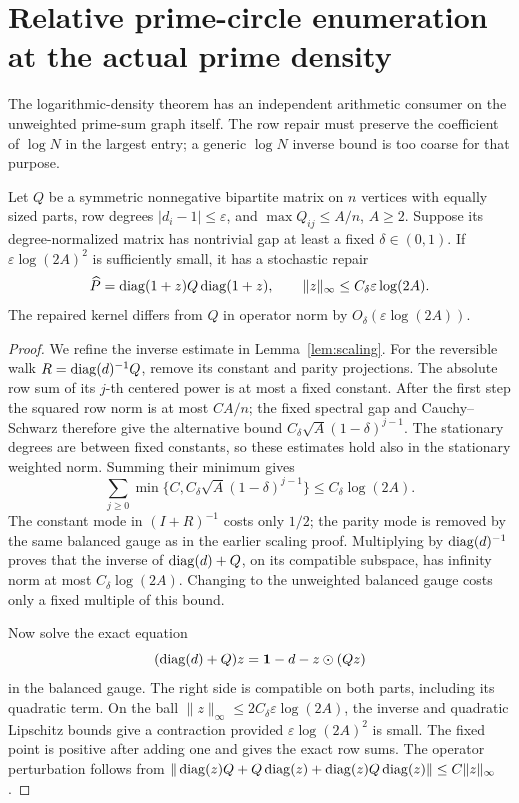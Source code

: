 \section{Relative prime-circle enumeration at the actual prime density}
\label{sec:relativeprimecircles}
The logarithmic-density theorem has an independent arithmetic
consumer on the unweighted prime-sum graph itself.
The row repair must preserve the coefficient of \(\log N\)
in the largest entry; a generic \(\log N\) inverse bound is
too coarse for that purpose.

\begin{lemma}
\label{lem:diffusionscaling}
Let \(Q\) be a symmetric nonnegative bipartite matrix on
\(n\) vertices with equally sized parts, row degrees
\(|d_i-1|\leq\varepsilon\), and \(\max Q_{ij}\leq A/n\),
\(A\geq2\).
Suppose its degree-normalized matrix has nontrivial gap
at least a fixed \(\delta\in(0,1)\).
If \(\varepsilon\log(2A)^2\) is sufficiently small, it has
a stochastic repair
\[
 \widehat P=\operatorname{diag}(1+z)Q\operatorname{diag}(1+z),\qquad
 \|z\|_\infty\leq C_\delta\varepsilon\log(2A).
\]
The repaired kernel differs from \(Q\) in operator norm
by \(O_\delta(\varepsilon\log(2A))\).
\end{lemma}
\begin{proof}
We refine the inverse estimate in Lemma~\ref{lem:scaling}.
For the reversible walk \(R=\operatorname{diag}(d)^{-1}Q\), remove its
constant and parity projections.
The absolute row sum of its \(j\)-th centered power is at
most a fixed constant.
After the first step the squared row norm is at most
\(C A/n\); the fixed spectral gap and Cauchy--Schwarz
therefore give the alternative bound
\(C_\delta\sqrt A(1-\delta)^{j-1}\).
The stationary degrees are between fixed constants, so
these estimates hold also in the stationary weighted norm.
Summing their minimum gives
\[
 \sum_{j\geq0}\min\{C,C_\delta\sqrt A
                                      (1-\delta)^{j-1}\}
                         \leq C_\delta\log(2A).
\]
The constant mode in \((I+R)^{-1}\) costs only \(1/2\);
the parity mode is removed by the same balanced gauge
as in the earlier scaling proof.
Multiplying by \(\operatorname{diag}(d)^{-1}\) proves that the inverse
of \(\operatorname{diag}(d)+Q\), on its compatible subspace, has
infinity norm at most \(C_\delta\log(2A)\).
Changing to the unweighted balanced gauge costs only a
fixed multiple of this bound.

Now solve the exact equation
\[
 (\operatorname{diag}(d)+Q)z=\mathbf1-d-z\mathbin{\odot}(Qz)
\]
in the balanced gauge.
The right side is compatible on both parts, including
its quadratic term.
On the ball
\(\|z\|_\infty\leq 2C_\delta\varepsilon\log(2A)\),
the inverse and quadratic Lipschitz bounds give a
contraction provided \(\varepsilon\log(2A)^2\) is small.
The fixed point is positive after adding one and gives
the exact row sums.
The operator perturbation follows from
\(\|\operatorname{diag}(z)Q+Q\operatorname{diag}(z)+\operatorname{diag}(z)Q\operatorname{diag}(z)\|
 \leq C\|z\|_\infty\).
\end{proof}


